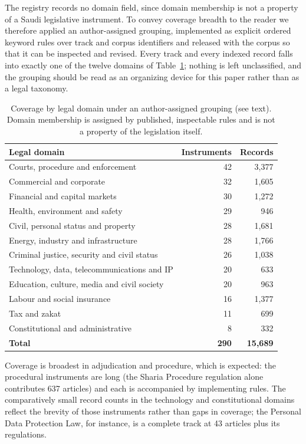 \documentclass[sn-basic]{sn-jnl}%
\begin{document}
The registry records no domain field, since domain membership is not a
property of a Saudi legislative instrument. To convey coverage breadth to
the reader we therefore applied an author-assigned grouping, implemented as
explicit ordered keyword rules over track and corpus identifiers and
released with the corpus so that it can be inspected and revised. Every
track and every indexed record falls into exactly one of the twelve domains
of Table~\ref{tab:domains}; nothing is left unclassified, and the grouping
should be read as an organizing device for this paper rather than as a legal
taxonomy.

\begin{table}[t]
\centering
\small
\begin{tabular}{lrr}
\toprule
\textbf{Legal domain} & \textbf{Instruments} & \textbf{Records} \\
\midrule
Courts, procedure and enforcement & 42 & 3{,}377 \\
Commercial and corporate & 32 & 1{,}605 \\
Financial and capital markets & 30 & 1{,}272 \\
Health, environment and safety & 29 & 946 \\
Civil, personal status and property & 28 & 1{,}681 \\
Energy, industry and infrastructure & 28 & 1{,}766 \\
Criminal justice, security and civil status & 26 & 1{,}038 \\
Technology, data, telecommunications and IP & 20 & 633 \\
Education, culture, media and civil society & 20 & 963 \\
Labour and social insurance & 16 & 1{,}377 \\
Tax and zakat & 11 & 699 \\
Constitutional and administrative & 8 & 332 \\
\midrule
\textbf{Total} & \textbf{290} & \textbf{15{,}689} \\
\bottomrule
\end{tabular}
\caption{Coverage by legal domain under an author-assigned grouping (see
text). Domain membership is assigned by published, inspectable rules and is
not a property of the legislation itself.}
\label{tab:domains}
\end{table}

Coverage is broadest in adjudication and procedure, which is expected: the
procedural instruments are long (the Sharia Procedure regulation alone
contributes 637 articles) and each is accompanied by implementing rules.
The comparatively small record counts in the technology and constitutional
domains reflect the brevity of those instruments rather than gaps in
coverage; the Personal Data Protection Law, for instance, is a complete
track at 43 articles plus its regulations.
\end{document}
